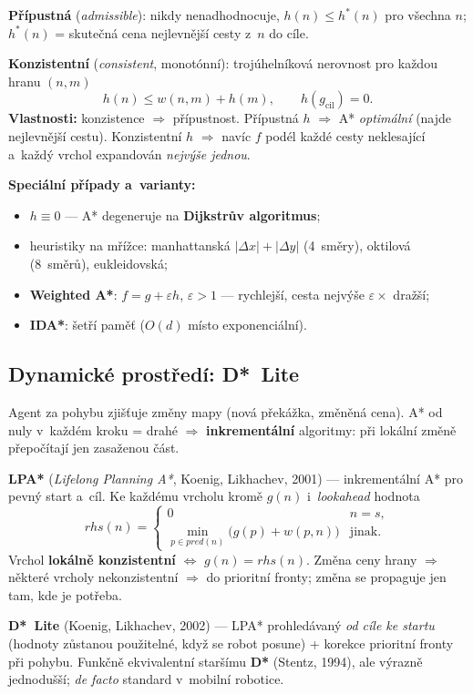 \documentclass[11pt,a4paper]{article}
\theoremstyle{definition}
\begin{document}
\begin{defbox}
\textbf{Přípustná} (\emph{admissible}): nikdy nenadhodnocuje, $h(n) \le h^*(n)$ pro všechna
$n$; $h^*(n)$ = skutečná cena nejlevnější cesty z~$n$ do cíle.

\textbf{Konzistentní} (\emph{consistent}, monotónní): trojúhelníková nerovnost pro každou
hranu $(n,m)$
\[
h(n) \le w(n,m) + h(m), \qquad h(g_{\mathrm{cil}}) = 0 .
\]
\textbf{Vlastnosti:} konzistence $\Rightarrow$ přípustnost. Přípustná $h$ $\Rightarrow$ A*
\emph{optimální} (najde nejlevnější cestu). Konzistentní $h$ $\Rightarrow$ navíc $f$ podél
každé cesty neklesající a~každý vrchol expandován \emph{nejvýše jednou}.
\end{defbox}

\textbf{Speciální případy a~varianty:}
\begin{itemize}
\item $h \equiv 0$ --- A* degeneruje na \textbf{Dijkstrův algoritmus};
\item heuristiky na mřížce: manhattanská $|\Delta x| + |\Delta y|$ (4~směry), oktilová
  (8~směrů), eukleidovská;
\item \textbf{Weighted A*}: $f = g + \varepsilon h$, $\varepsilon > 1$ --- rychlejší, cesta
  nejvýše $\varepsilon\times$ dražší;
\item \textbf{IDA*}: šetří paměť ($O(d)$ místo exponenciální).
\end{itemize}

\subsection{Dynamické prostředí: D*~Lite}

Agent za pohybu zjišťuje změny mapy (nová překážka, změněná cena). A* od nuly v~každém kroku
= drahé $\Rightarrow$ \textbf{inkrementální} algoritmy: při lokální změně přepočítají jen
zasaženou část.

\begin{defbox}
\textbf{LPA*} (\emph{Lifelong Planning A*}, Koenig, Likhachev, 2001) --- inkrementální A* pro
pevný start a~cíl. Ke každému vrcholu kromě $g(n)$ i~\emph{lookahead} hodnota
\[
\mathit{rhs}(n) = \begin{cases}
0 & n = s,\\
\min_{p \in \mathit{pred}(n)} \big(g(p) + w(p,n)\big) & \text{jinak.}
\end{cases}
\]
Vrchol \textbf{lokálně konzistentní} $\Leftrightarrow$ $g(n) = \mathit{rhs}(n)$. Změna ceny
hrany $\Rightarrow$ některé vrcholy nekonzistentní $\Rightarrow$ do prioritní fronty; změna se
propaguje jen tam, kde je potřeba.

\textbf{D*~Lite} (Koenig, Likhachev, 2002) --- LPA* prohledávaný \emph{od cíle ke startu}
(hodnoty zůstanou použitelné, když se robot posune) + korekce prioritní fronty při pohybu.
Funkčně ekvivalentní staršímu \textbf{D*} (Stentz, 1994), ale výrazně jednodušší; \emph{de
facto} standard v~mobilní robotice.
\end{defbox}
\end{document}
